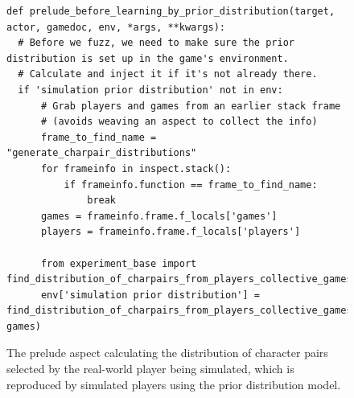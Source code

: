 \begin{figure}[hp]
  \centering
  \begin{lstlisting}[style=footnotesize_python]
def prelude_before_learning_by_prior_distribution(target, actor, gamedoc, env, *args, **kwargs):
  # Before we fuzz, we need to make sure the prior distribution is set up in the game's environment.
  # Calculate and inject it if it's not already there.
  if 'simulation prior distribution' not in env:
      # Grab players and games from an earlier stack frame
      # (avoids weaving an aspect to collect the info)
      frame_to_find_name = "generate_charpair_distributions"
      for frameinfo in inspect.stack():
          if frameinfo.function == frame_to_find_name:
              break
      games = frameinfo.frame.f_locals['games']
      players = frameinfo.frame.f_locals['players']

      from experiment_base import find_distribution_of_charpairs_from_players_collective_games
      env['simulation prior distribution'] = find_distribution_of_charpairs_from_players_collective_games(players, games)
  \end{lstlisting}
  \caption{The prelude aspect calculating the distribution of character pairs selected by the real-world player being simulated, which is reproduced by simulated players using the prior distribution model.}
  \label{fig:prelude_before_learning_by_prior_distribution}
\end{figure}

